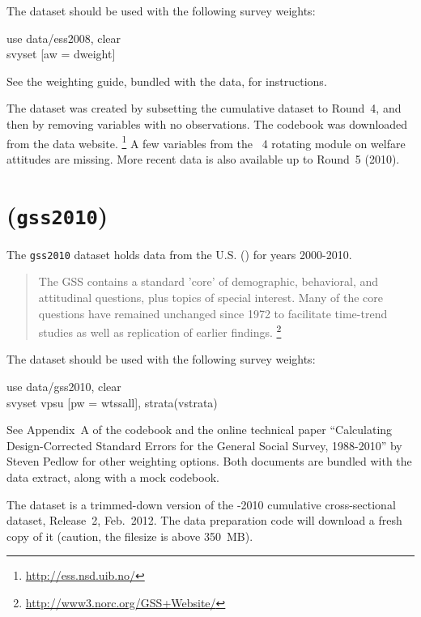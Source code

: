 The \ESS dataset should be used with the following survey weights:

\begin{docspec}
	use data/ess2008, clear\\
	svyset [aw = dweight]
\end{docspec}

See the \ESS weighting guide, bundled with the data, for instructions.

The dataset was created by subsetting the \ESS cumulative dataset to Round~4, and then by removing variables with no observations. The codebook was downloaded from the \ESS data website.%
  \footnote{\url{http://ess.nsd.uib.no/}} %
  A few variables from the \ESS~4 rotating module on welfare attitudes are missing. More recent data is also available up to Round~5 (2010).%

\section*{\gss (\texttt{gss2010})}

The \texttt{gss2010} dataset holds data from the U.S. \gss (\GSS) for years 2000-2010.

\begin{quote}
	The GSS contains a standard 'core' of demographic, behavioral, and attitudinal questions, plus topics of special interest. Many of the core questions have remained unchanged since 1972 to facilitate time-trend studies as well as replication of earlier findings.%
	\footnote{\url{http://www3.norc.org/GSS+Website/}}
\end{quote}

The \GSS dataset should be used with the following survey weights:

\begin{docspec}
	use data/gss2010, clear\\
	svyset vpsu [pw = wtssall], strata(vstrata)
\end{docspec}

See Appendix~A of the \GSS codebook and the online technical paper ``Calculating Design-Corrected Standard Errors for the General Social Survey, 1988-2010'' by Steven Pedlow for other weighting options. Both documents are bundled with the data extract, along with a mock codebook.%

The dataset is a trimmed-down version of the -2010 cumulative cross-sectional dataset, Release~2, Feb.~2012. The data preparation code will download a fresh copy of it (caution, the filesize is above 350~MB).%

